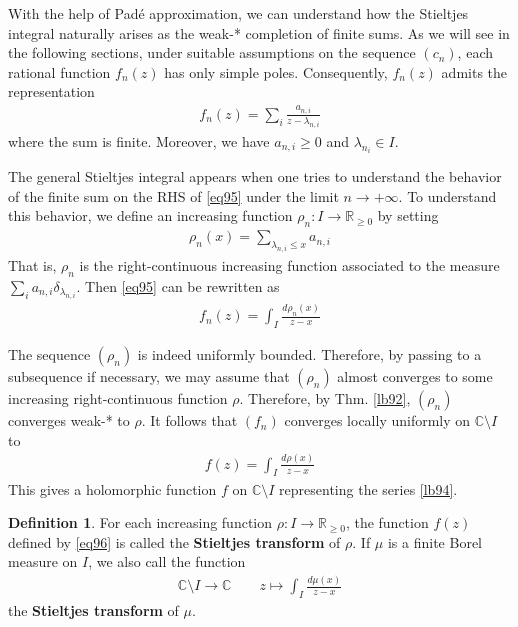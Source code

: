 \documentclass[12pt,b5paper,notitlepage]{article}
\theoremstyle{definition}
\newtheorem{df}{Definition}[subsection]
\theoremstyle{plain}
\newcommand{\Cbb}{\mathbb C}
\newcommand{\Rbb}{\mathbb R}
\numberwithin{equation}{section}
\begin{document}
With the help of Pad\'e approximation, we can understand how the Stieltjes integral naturally arises as the weak-* completion of finite sums. As we will see in the following sections, under suitable assumptions on the sequence $(c_n)$, each rational function $f_n(z)$ has only simple poles. Consequently, $f_n(z)$ admits the representation
\begin{align}\label{eq95}
f_n(z)=\sum_i \frac{a_{n,i}}{z-\lambda_{n,i}}
\end{align}
where the sum is finite. Moreover, we have $a_{n,i}\geq0$ and $\lambda_{n_i}\in I$.


The general Stieltjes integral appears when one tries to understand the behavior of the finite sum on the RHS of \eqref{eq95} under the limit $n\rightarrow+\infty$. To understand this behavior, we define an increasing function $\rho_n:I\rightarrow\Rbb_{\geq0}$ by setting
\begin{align*}
\rho_n(x)=\sum_{\lambda_{n,i}\leq x}a_{n,i}
\end{align*}
That is, $\rho_n$ is the right-continuous increasing function associated to the measure $\sum_i a_{n,i}\delta_{\lambda_{n,i}}$. Then \eqref{eq95} can be rewritten as
\begin{align*}
f_n(z)=\int_I \frac{d\rho_n(x)}{z-x}
\end{align*}


The sequence $(\rho_n)$ is indeed uniformly bounded. Therefore, by passing to a subsequence if necessary, we may assume that $(\rho_n)$ almost converges to some increasing right-continuous function $\rho$. Therefore, by Thm. \ref{lb92}, $(\rho_n)$ converges weak-* to $\rho$. It follows that $(f_n)$ converges locally uniformly on $\Cbb\setminus I$ to
\begin{align}\label{eq96}
f(z)=\int_I\frac{d\rho(x)}{z-x}
\end{align}
This gives a holomorphic function $f$ on $\Cbb\setminus I$ representing the series \ref{lb94}.

\begin{df}
For each increasing function $\rho:I\rightarrow\Rbb_{\geq0}$, the function $f(z)$ defined by \eqref{eq96} is called the \textbf{Stieltjes transform}  of $\rho$. If $\mu$ is a finite Borel measure on $I$, we also call the function
\begin{align*}
\Cbb\setminus I\rightarrow\Cbb\qquad z\mapsto\int_I\frac{d\mu(x)}{z-x}
\end{align*}
the \textbf{Stieltjes transform} of $\mu$.
\end{df}
\end{document}
